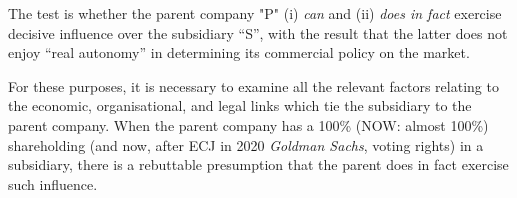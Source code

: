             The test is whether the parent company "P" (i) \textit{can} and (ii) \textit{does in fact} exercise decisive influence over the subsidiary ``S'', with the result that the latter does not enjoy ``real autonomy'' in determining its commercial policy on the market.
            
            For these purposes, it is necessary to examine all the relevant factors relating to the economic, organisational, and legal links which tie the subsidiary to the parent company. When the parent company has a 100\% (NOW: almost 100\%) shareholding (and now, after ECJ in 2020 \textit{Goldman Sachs}, voting rights) in a subsidiary, there is a rebuttable presumption that the parent does in fact exercise such influence.

